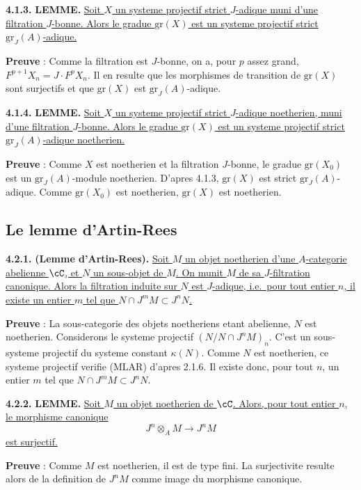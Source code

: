 \medskip
\noindent\textbf{4.1.3.} \textbf{LEMME.} \underline{Soit $X$ un systeme projectif strict $J$-adique muni d'une filtration $J$-bonne. Alors le gradue $\mathrm{gr}(X)$ est un systeme projectif strict $\mathrm{gr}_J(A)$-adique.}

\textbf{Preuve} : Comme la filtration est $J$-bonne, on a, pour $p$ assez grand, $F^{p+1} X_n = J \cdot F^p X_n$. Il en resulte que les morphismes de transition de $\mathrm{gr}(X)$ sont surjectifs et que $\mathrm{gr}(X)$ est $\mathrm{gr}_J(A)$-adique.

\medskip
\noindent\textbf{4.1.4.} \textbf{LEMME.} \underline{Soit $X$ un systeme projectif strict $J$-adique noetherien, muni d'une filtration $J$-bonne. Alors le gradue $\mathrm{gr}(X)$ est un systeme projectif strict $\mathrm{gr}_J(A)$-adique noetherien.}

\textbf{Preuve} : Comme $X$ est noetherien et la filtration $J$-bonne, le gradue $\mathrm{gr}(X_0)$ est un $\mathrm{gr}_J(A)$-module noetherien. D'apres 4.1.3, $\mathrm{gr}(X)$ est strict $\mathrm{gr}_J(A)$-adique. Comme $\mathrm{gr}(X_0)$ est noetherien, $\mathrm{gr}(X)$ est noetherien.

\subsection{Le lemme d'Artin-Rees}

\medskip
\noindent\textbf{4.2.1.} \textbf{(Lemme d'Artin-Rees).} \underline{Soit $M$ un objet noetherien d'une $A$-categorie abelienne $\cC$, et $N$ un sous-objet de $M$. On munit $M$ de sa $J$-filtration canonique. Alors la filtration induite sur $N$ est $J$-adique, i.e.\ pour tout entier $n$, il existe un entier $m$ tel que $N \cap J^m M \subset J^n N$.}

\textbf{Preuve} : La sous-categorie des objets noetheriens etant abelienne, $N$ est noetherien. Considerons le systeme projectif $(N / N \cap J^n M)_n$. C'est un sous-systeme projectif du systeme constant $\kappa(N)$. Comme $N$ est noetherien, ce systeme projectif verifie (MLAR) d'apres 2.1.6. Il existe donc, pour tout $n$, un entier $m$ tel que $N \cap J^m M \subset J^n N$.

\medskip
\noindent\textbf{4.2.2.} \textbf{LEMME.} \underline{Soit $M$ un objet noetherien de $\cC$. Alors, pour tout entier $n$, le morphisme canonique}
\[
J^n \otimes_A M \longrightarrow J^n M
\]
\underline{est surjectif.}

\textbf{Preuve} : Comme $M$ est noetherien, il est de type fini. La surjectivite resulte alors de la definition de $J^n M$ comme image du morphisme canonique.


